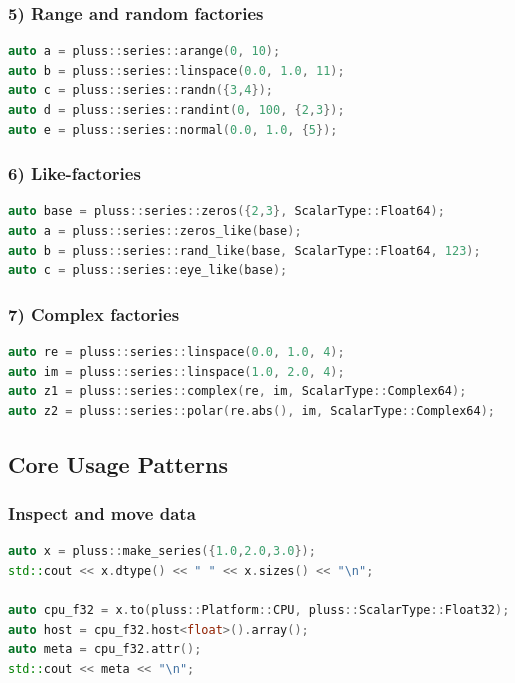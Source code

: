 \documentclass[11pt]{article}
\begin{document}
\subsubsection{5) Range and random factories}
\begin{lstlisting}[language=C++]
auto a = pluss::series::arange(0, 10);
auto b = pluss::series::linspace(0.0, 1.0, 11);
auto c = pluss::series::randn({3,4});
auto d = pluss::series::randint(0, 100, {2,3});
auto e = pluss::series::normal(0.0, 1.0, {5});
\end{lstlisting}

\subsubsection{6) Like-factories}
\begin{lstlisting}[language=C++]
auto base = pluss::series::zeros({2,3}, ScalarType::Float64);
auto a = pluss::series::zeros_like(base);
auto b = pluss::series::rand_like(base, ScalarType::Float64, 123);
auto c = pluss::series::eye_like(base);
\end{lstlisting}

\subsubsection{7) Complex factories}
\begin{lstlisting}[language=C++]
auto re = pluss::series::linspace(0.0, 1.0, 4);
auto im = pluss::series::linspace(1.0, 2.0, 4);
auto z1 = pluss::series::complex(re, im, ScalarType::Complex64);
auto z2 = pluss::series::polar(re.abs(), im, ScalarType::Complex64);
\end{lstlisting}

\subsection{Core Usage Patterns}
\subsubsection{Inspect and move data}
\begin{lstlisting}[language=C++]
auto x = pluss::make_series({1.0,2.0,3.0});
std::cout << x.dtype() << " " << x.sizes() << "\n";

auto cpu_f32 = x.to(pluss::Platform::CPU, pluss::ScalarType::Float32);
auto host = cpu_f32.host<float>().array();
auto meta = cpu_f32.attr();
std::cout << meta << "\n";
\end{lstlisting}
\end{document}
